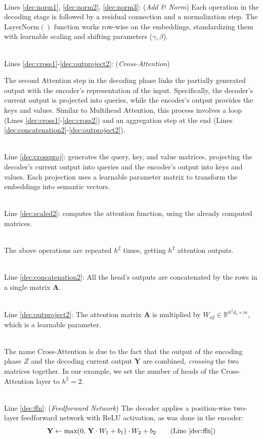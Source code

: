 \documentclass[algorithms,article,submit,pdftex,moreauthors]{Definitions/mdpi}
\begin{document}
~\\Lines \ref{dec:norm1}, \ref{dec:norm2}, \ref{dec:norm3}: (\textit{Add \& Norm})
Each operation in the decoding stage is followed by a residual connection and a normalization step. The $\text{LayerNorm}()$ function works row-wise on the embeddings, standardizing them with learnable scaling and shifting parameters ($\gamma, \beta$).

~\\Lines \ref{dec:cross1}-\ref{dec:outproject2}: (\textit{Cross-Attention})

\noindent The second Attention step in the decoding phase links the partially generated output with the encoder’s representation of the input. Specifically, the decoder’s current output is projected into queries, while the encoder’s output provides the keys and values. Similar to Multihead Attention, this process involves a loop (Lines \ref{dec:cross1}-\ref{dec:cross2}) and an aggregation step at the end (Lines \ref{dec:concatenation2}-\ref{dec:outproject2}).

~\\Line \ref{dec:crossproj}: generates the query, key, and value matrices, projecting the decoder’s current output into queries and the encoder’s output into keys and values. Each projection uses a learnable parameter matrix to transform the embeddings into semantic vectors.

~\\Line \ref{dec:scaled2}: computes the attention function, using the already computed matrices.

~\\The above operations are repeated $h^2$ times, getting $h^2$ attention outputs.

~\\Line \ref{dec:concatenation2}: All the head's outputs are concatenated by the rows in a single matrix $\textbf{A}$.

~\\Line \ref{dec:outproject2}: The attention matrix $\textbf{A}$ is multiplied by $W_{o2} \in \mathbb{R}^{h^2d_v \times m}$, which is a learnable parameter.

~\\The name Cross-Attention is due to the fact that the output of the encoding phase $Z$ and the decoding current output $\textbf{Y}$ are combined, \textit{crossing} the two matrices together. In our example, we set the number of heads of the Cross-Attention layer to $h^2 = 2$.

~\\Line \ref{dec:ffn}: (\textit{Feedforward Network})
\noindent The decoder applies a position-wise two-layer feedforward network with ReLU activation, as was done in the encoder:
\begin{equation}
    \textbf{Y} \leftarrow \text{max}(0,\,\textbf{Y}\cdot W_1 + b_1) \cdot W_2 + b_2
\tag{Line \ref{dec:ffn}}
\end{equation}
\end{document}
